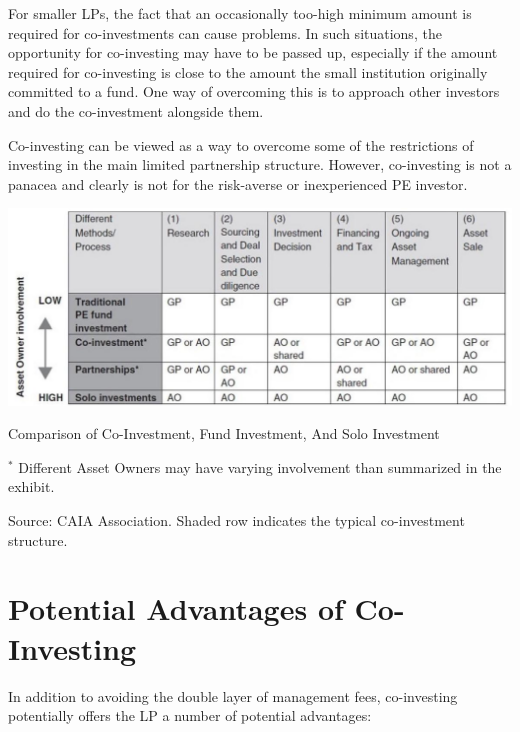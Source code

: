 \documentclass[11pt]{article}
\begin{document}
For smaller LPs, the fact that an occasionally too-high minimum amount is required for co-investments can cause problems. In such situations, the opportunity for co-investing may have to be passed up, especially if the amount required for co-investing is close to the amount the small institution originally committed to a fund. One way of overcoming this is to approach other investors and do the co-investment alongside them.

Co-investing can be viewed as a way to overcome some of the restrictions of investing in the main limited partnership structure. However, co-investing is not a panacea and clearly is not for the risk-averse or inexperienced PE investor.

\begin{center}
\includegraphics[max width=\textwidth]{2024_04_10_a087d40a569f64263ea7g-4}
\end{center}

Comparison of Co-Investment, Fund Investment, And Solo Investment

${ }^{*}$ Different Asset Owners may have varying involvement than summarized in the exhibit.

Source: CAIA Association. Shaded row indicates the typical co-investment structure.

\section*{Potential Advantages of Co-Investing}
In addition to avoiding the double layer of management fees, co-investing potentially offers the LP a number of potential advantages:
\end{document}
